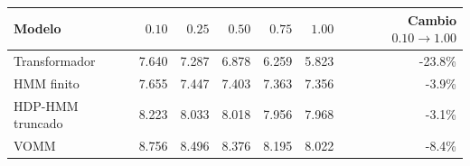 \begin{tabular}{lrrrrrr}
\hline
Modelo & $0.10$ & $0.25$ & $0.50$ & $0.75$ & $1.00$ & Cambio $0.10\to1.00$ \\
\hline
Transformador & 7.640 & 7.287 & 6.878 & 6.259 & 5.823 & -23.8\% \\
HMM finito & 7.655 & 7.447 & 7.403 & 7.363 & 7.356 & -3.9\% \\
HDP-HMM truncado & 8.223 & 8.033 & 8.018 & 7.956 & 7.968 & -3.1\% \\
VOMM & 8.756 & 8.496 & 8.376 & 8.195 & 8.022 & -8.4\% \\
\hline
\end{tabular}
